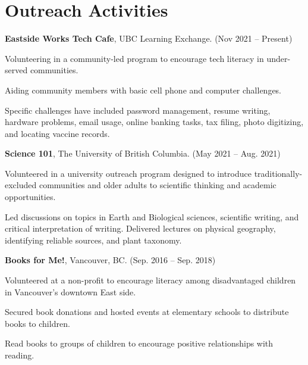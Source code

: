 \documentclass[11pt,letterpaper]{article}
\renewenvironment{itemize}{
	\begin{list}{}{
			\setlength{\leftmargin}{1.5em}
			\setlength{\rightmargin}{0em}  %
			\setlength{\itemsep}{0.25em}
			\setlength{\parskip}{0pt}
			\setlength{\parsep}{0.25em}
		}
	}{
	\end{list}
}
\newenvironment{itemizeit}
{\itemize\let\origitem\item
	\renewcommand{\item}[1][default]
	{\origitem[\tiny $\blacksquare$]}}
{\enditemize}
\renewenvironment{itemize}{
	\begin{list}{}{
			\setlength{\leftmargin}{1.5em}
			\setlength{\itemsep}{0.25em}
			\setlength{\parskip}{0pt}
			\setlength{\parsep}{0.25em}
		}
	}{
	\end{list}
}
\begin{document}
\section*{Outreach Activities}
\begin{itemize}
	
\item {\bf Eastside Works Tech Cafe}, UBC Learning Exchange. \hfill(Nov 2021 -- Present)
	\begin{itemizeit}
		\item Volunteering in a community-led program to encourage tech literacy in under-served communities.
		\item Aiding community members with basic cell phone and computer challenges.
		\item Specific challenges have included password management, resume writing, hardware problems, email usage, online banking tasks, tax filing, photo digitizing, and locating vaccine records.
	\end{itemizeit}

\item {\bf Science 101}, The University of British Columbia. \hfill (May 2021 -- Aug. 2021)
	\begin{itemizeit} 
		\item Volunteered in a university outreach program designed to introduce traditionally-excluded communities and older adults to scientific thinking and academic opportunities.
		\item Led discussions on topics in Earth and Biological sciences, scientific writing, and critical interpretation of writing. Delivered lectures on physical geography, identifying reliable sources, and plant taxonomy.
	\end{itemizeit}

\item { \bf Books for Me!}, Vancouver, BC. \hfill (Sep. 2016 -- Sep. 2018)

	\begin{itemizeit} %
		\item Volunteered at a non-profit to encourage literacy among disadvantaged children in Vancouver's downtown East side.
		\item Secured book donations and hosted events at elementary schools to distribute books to children.
		\item Read books to groups of children to encourage positive relationships with reading.
	\end{itemizeit}
\end{itemize}
\end{document}
